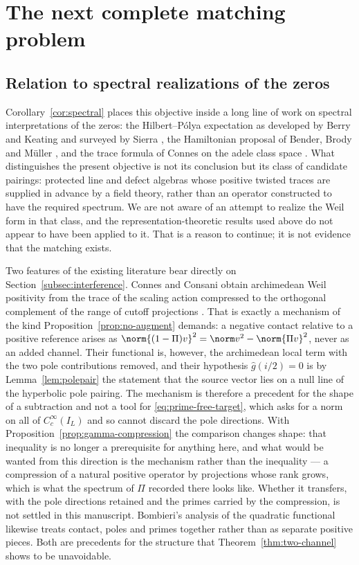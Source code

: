 \section{The next complete matching problem}\label{sec:outlook}
\subsection{Relation to spectral realizations of the zeros}
Corollary~\ref{cor:spectral} places this objective inside a long line of work
on spectral interpretations of the zeros: the Hilbert--P\'olya expectation as
developed by Berry and Keating \cite{BerryKeating} and surveyed by Sierra
\cite{Sierra}, the Hamiltonian proposal of Bender, Brody and M\"uller
\cite{BBM}, and the trace formula of Connes on the adele class space
\cite{ConnesTrace,CCM}. What distinguishes the present objective is not its
conclusion but its class of candidate pairings: protected line and defect
algebras whose positive twisted traces are supplied in advance by a field
theory, rather than an operator constructed to have the required spectrum.
We are not aware of an attempt to realize the Weil form in that class, and
the representation-theoretic results used above
\cite{Sphere,Schur,RG,EKRS,Klyuev} do not appear to have been applied to it.
That is a reason to continue; it is not evidence that the matching exists.

Two features of the existing literature bear directly on
Section~\ref{subsec:interference}. Connes and Consani obtain archimedean Weil
positivity from the trace of the scaling action compressed to the orthogonal
complement of the range of cutoff projections \cite{CCWeil}. That is exactly
a mechanism of the kind Proposition~\ref{prop:no-augment} demands: a negative
contact relative to a positive reference arises as
$\norm{(1-\Pi)v}^2=\norm v^2-\norm{\Pi v}^2$, never as an added channel.
Their functional is, however, the archimedean local term with the two pole
contributions removed, and their hypothesis $\widehat g(i/2)=0$ is by
Lemma~\ref{lem:polepair} the statement that the source vector lies on a null
line of the hyperbolic pole pairing. The mechanism is therefore a precedent
for the shape of a subtraction and not a tool for \eqref{eq:prime-free-target},
which asks for a norm on all of $C_c^\infty(I_L)$ and so cannot discard the
pole directions. With Proposition~\ref{prop:gamma-compression} the comparison
changes shape: that inequality is no longer a prerequisite for anything here,
and what would be wanted from this direction is the mechanism rather than the
inequality --- a compression of a natural positive operator by projections
whose rank grows, which is what the spectrum of $\Pi$ recorded there looks
like. Whether it transfers, with the pole directions retained and the primes
carried by the compression, is not settled in this manuscript.
Bombieri's analysis of the quadratic functional
\cite{Bombieri} likewise treats contact, poles and primes together rather than
as separate positive pieces. Both are precedents for the structure that
Theorem~\ref{thm:two-channel} shows to be unavoidable.

